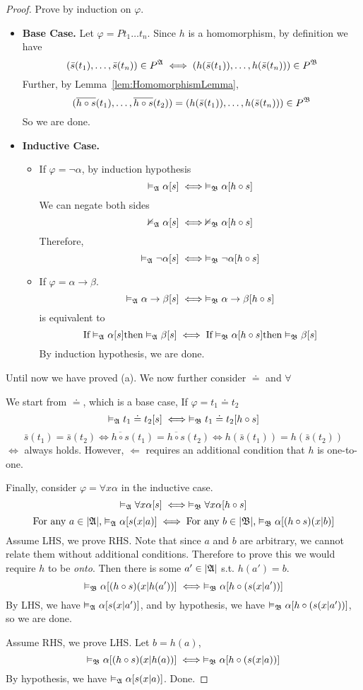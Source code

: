 \begin{proof}
    Prove by induction on $\varphi$.
    \begin{itemize}
        \item[] \textbf{Base Case.} Let $\varphi = Pt_1\dots t_n$.
         Since $h$ is a homomorphism, by definition we have
         \[ (\bar{s}(t_1),\dots,\bar{s}(t_n))\in P^{\mathfrak{A}} \iff (h(\bar{s}(t_1)),\dots, h(\bar{s}(t_n))) \in P^{\mathfrak{B}} \]
         Further, by Lemma~\ref{lem:HomomorphismLemma},
         \[ (\overline{h\circ s}(t_1),\dots,\overline{h\circ s}(t_2)) = (h(\bar{s}(t_1)),\dots, h(\bar{s}(t_n))) \in P^{\mathfrak{B}} \]
         So we are done.
         \item[] \textbf{Inductive Case.}\begin{itemize}
             \item If $\varphi = \neg \alpha$, by induction hypothesis
             \[ \vDash_{\mathfrak{A}}\alpha[s] \iff \vDash_{\mathfrak{B}}\alpha[h \circ s] \]
             We can negate both sides
             \[ \nvDash_{\mathfrak{A}}\alpha[s] \iff \nvDash_{\mathfrak{B}}\alpha[h \circ s] \]
             Therefore,
             \[ \vDash_{\mathfrak{A}}\neg\alpha[s] \iff \vDash_{\mathfrak{B}}\neg\alpha[h\circ s] \]
             \item If $\varphi = \alpha \to \beta$.
             \[ \vDash_{\mathfrak{A}}\alpha\to\beta[s] \iff \vDash_{\mathfrak{B}}\alpha\to\beta[h\circ s] \]
             is equivalent to
             \[ \text{If} \vDash_{\mathfrak{A}}\alpha[s] \text{then} \vDash_{\mathfrak{A}}\beta[s] \iff \text{If} \vDash_{\mathfrak{B}}\alpha[h \circ s] \text{then} \vDash_{\mathfrak{B}}\beta[s] \]
             By induction hypothesis, we are done.
         \end{itemize}
    \end{itemize}
    Until now we have proved (a). We now further consider $\doteq$ and $\forall$

    We start from $\doteq$, which is a base case,
    If $\varphi = t_1\doteq t_2$
        \[ \vDash_{\mathfrak{A}}t_1\doteq t_2[s] \iff \vDash_{\mathfrak{B}}t_1\doteq t_2[h\circ s] \]
        \[ \bar{s}(t_1) = \bar{s}(t_2) \iff \overline{h\circ s}(t_1) = \overline{h\circ s}(t_2) \iff h(\bar{s}(t_1)) = h(\bar{s}(t_2)) \]
        $\Leftrightarrow$ always holds. However, $\Leftarrow$ requires an additional condition that $h$ is one-to-one.

    Finally, consider $\varphi=\forall x\alpha$ in the inductive case.
    \[ \vDash_{\mathfrak{A}}\forall x \alpha[s] \iff \vDash_{\mathfrak{B}}\forall x \alpha[h\circ s] \]
    \[ \text{For any $a\in|\mathfrak{A}|$,} \vDash_{\mathfrak{A}}\alpha[s(x|a)] \iff \text{For any $b\in|\mathfrak{B}|$,}\vDash_{\mathfrak{B}}\alpha[(h\circ s)(x|b)] \]
    Assume LHS, we prove RHS. Note that since $a$ and $b$ are arbitrary, we cannot relate them without additional conditions. Therefore to prove this we would require $h$ to be \emph{onto}. Then there is some $a'\in|\mathfrak{A}|$ s.t. $h(a')=b$.
    \[ \vDash_{\mathfrak{B}}\alpha[(h\circ s)(x|h(a'))] \iff \vDash_{\mathfrak{B}}\alpha[h\circ(s(x|a'))] \]
    By LHS, we have $\vDash_{\mathfrak{A}}\alpha[s(x|a')]$, and by hypothesis, we have $\vDash_{\mathfrak{B}}\alpha[h\circ (s(x|a'))]$, so we are done.

    Assume RHS, we prove LHS. Let $b=h(a)$,
    \[ \vDash_{\mathfrak{B}}\alpha[(h\circ s)(x|h(a))] \iff \vDash_{\mathfrak{B}}\alpha[h\circ(s(x|a))] \]
    By hypothesis, we have $\vDash_{\mathfrak{A}}\alpha[s(x|a)]$. Done.
\end{proof}

